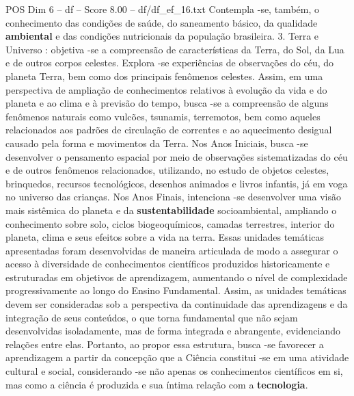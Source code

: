 \begin{textsample}{POS Dim 6 – df – Score 8.00 – df/df\_ef\_16.txt}
Contempla -se, também, o conhecimento das condições de saúde, do saneamento básico, da qualidade \textbf{ambiental} e das condições nutricionais da população brasileira. 3.
Terra e Universo : objetiva -se a compreensão de características da Terra, do Sol, da Lua e de outros corpos celestes.
Explora -se experiências de observações do céu, do planeta Terra, bem como dos principais fenômenos celestes.
Assim, em uma perspectiva de ampliação de conhecimentos relativos à evolução da vida e do planeta e ao clima e à previsão do tempo, busca -se a compreensão de alguns fenômenos naturais como vulcões, tsunamis, terremotos, bem como aqueles relacionados aos padrões de circulação de correntes e ao aquecimento desigual causado pela forma e movimentos da Terra.
Nos Anos Iniciais, busca -se desenvolver o pensamento espacial por meio de observações sistematizadas do céu e de outros fenômenos relacionados, utilizando, no estudo de objetos celestes, brinquedos, recursos tecnológicos, desenhos animados e livros infantis, já em voga no universo das crianças.
Nos Anos Finais, intenciona -se desenvolver uma visão mais sistêmica do planeta e da \textbf{sustentabilidade} socioambiental, ampliando o conhecimento sobre solo, ciclos biogeoquímicos, camadas terrestres, interior do planeta, clima e seus efeitos sobre a vida na terra.
Essas unidades temáticas apresentadas foram desenvolvidas de maneira articulada de modo a assegurar o acesso à diversidade de conhecimentos científicos produzidos historicamente e estruturadas em objetivos de aprendizagem, aumentando o nível de complexidade progressivamente ao longo do Ensino Fundamental.
Assim, as unidades temáticas devem ser consideradas sob a perspectiva da continuidade das aprendizagens e da integração de seus conteúdos, o que torna fundamental que não sejam desenvolvidas isoladamente, mas de forma integrada e abrangente, evidenciando relações entre elas.
Portanto, ao propor essa estrutura, busca -se favorecer a aprendizagem a partir da concepção que a Ciência constitui -se em uma atividade cultural e social, considerando -se não apenas os conhecimentos científicos em si, mas como a ciência é produzida e sua íntima relação com a \textbf{tecnologia}.

\end{textsample}
